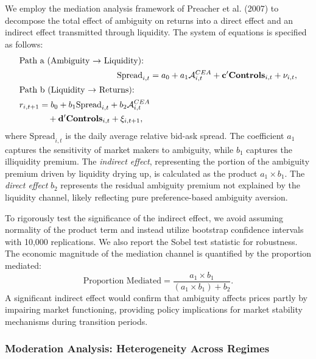 \documentclass[preprint,12pt,authoryear]{elsarticle}
\begin{document}
We employ the mediation analysis framework of Preacher et al. (2007) to decompose the total effect of ambiguity on returns into a direct effect and an indirect effect transmitted through liquidity. The system of equations is specified as follows:
\begin{align}
\intertext{Path a (Ambiguity $\to$ Liquidity):}
\text{Spread}_{i,t} &= a_0 + a_1 \mathcal{A}^{CEA}_{i,t} + \mathbf{c}'\mathbf{Controls}_{i,t} + \nu_{i,t}, \\
\intertext{Path b (Liquidity $\to$ Returns):}
\begin{split}
r_{i,t+1} &= b_0 + b_1 \text{Spread}_{i,t} + b_2 \mathcal{A}^{CEA}_{i,t} \\
&\quad + \mathbf{d}'\mathbf{Controls}_{i,t} + \xi_{i,t+1},
\end{split}
\end{align}
where $\text{Spread}_{i,t}$ is the daily average relative bid-ask spread. The coefficient $a_1$ captures the sensitivity of market makers to ambiguity, while $b_1$ captures the illiquidity premium. The \textit{indirect effect}, representing the portion of the ambiguity premium driven by liquidity drying up, is calculated as the product $a_1 \times b_1$. The \textit{direct effect} $b_2$ represents the residual ambiguity premium not explained by the liquidity channel, likely reflecting pure preference-based ambiguity aversion.

To rigorously test the significance of the indirect effect, we avoid assuming normality of the product term and instead utilize bootstrap confidence intervals with 10,000 replications. We also report the Sobel test statistic for robustness. The economic magnitude of the mediation channel is quantified by the proportion mediated:
\begin{equation}
\text{Proportion Mediated} = \frac{a_1 \times b_1}{(a_1 \times b_1) + b_2}.
\end{equation}
A significant indirect effect would confirm that ambiguity affects prices partly by impairing market functioning, providing policy implications for market stability mechanisms during transition periods.

\subsubsection{Moderation Analysis: Heterogeneity Across Regimes}
\end{document}
